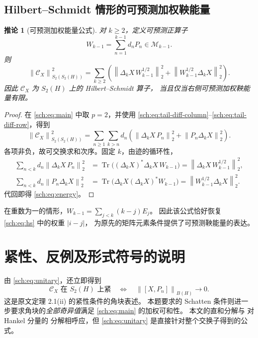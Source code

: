\documentclass[UTF8,11pt,a4paper,fontset=fandol]{ctexart}
\newtheorem{corollary}[theorem]{推论}
\theoremstyle{remark}
\newcommand{\Tr}{\operatorname{Tr}}
\newcommand{\CC}{\mathcal C}
\newcommand{\norm}[1]{\left\lVert #1\right\rVert}
\numberwithin{equation}{section}
\begin{document}
\subsection{Hilbert--Schmidt 情形的可预测加权鞅能量}

\begin{corollary}[可预测加权能量公式]\label{sch:cor:energy}
对 $k\geq2$，定义可预测正算子
\[
 W_{k-1}=\sum_{n=1}^{k-1}d_nP_n\in\mathcal M_{k-1}.
\]
则
\begin{equation}\label{sch:eq:energy}
 \boxed{\quad
 \norm{\CC_X}_{S_2(S_2(H))}^2
 =\sum_{k\geq2}\left(
   \norm{\Delta_kX\,W_{k-1}^{1/2}}_2^2
  +\norm{W_{k-1}^{1/2}\Delta_kX}_2^2\right).
 \quad}
\end{equation}
因此 $\CC_X$ 为 $S_2(H)$ 上的 Hilbert--Schmidt 算子，
当且仅当右侧可预测加权鞅能量有限。
\end{corollary}

\begin{proof}
在 \eqref{sch:eq:main} 中取 $p=2$，并使用
\eqref{sch:eq:tail-diff-column}--\eqref{sch:eq:tail-diff-row}，得到
\[
 \norm{\CC_X}_{S_2(S_2(H))}^2
 =\sum_{n\geq1}\sum_{k>n}d_n\left(
   \norm{\Delta_kX\,P_n}_2^2+\norm{P_n\Delta_kX}_2^2\right).
\]
各项非负，故可交换求和次序。固定 $k$，由迹的循环性，
\begin{align*}
 \sum_{n<k}d_n\norm{\Delta_kX\,P_n}_2^2
 &=\Tr\bigl((\Delta_kX)^*\Delta_kX\,W_{k-1}\bigr)
  =\norm{\Delta_kX\,W_{k-1}^{1/2}}_2^2,\\
 \sum_{n<k}d_n\norm{P_n\Delta_kX}_2^2
 &=\Tr\bigl(\Delta_kX(\Delta_kX)^*W_{k-1}\bigr)
  =\norm{W_{k-1}^{1/2}\Delta_kX}_2^2.
\end{align*}
代回即得 \eqref{sch:eq:energy}。
\end{proof}

在重数为一的情形，$W_{k-1}=\sum_{j<k}(k-j)E_j$。
因此该公式恰好恢复 \eqref{sch:eq:hs} 中的权重 $|i-j|$，
为原先的矩阵元素条件提供了可预测鞅能量的表达。

\section{紧性、反例及形式符号的说明}\label{sec:compact}

由 \eqref{sch:eq:unitary}，还立即得到
\[
 \CC_X\text{ 在 }S_2(H)\text{ 上紧}
 \quad\Longleftrightarrow\quad
 \norm{[X,P_n]}_{B(H)}\longrightarrow0.
\]
这是原文定理 2.1(ii) 的紧性条件的角块表述。
本题要求的 Schatten 条件则进一步要求角块的\emph{全部奇异值}满足
\eqref{sch:eq:main} 的加权可和性。
本文的直和分解与 \cite[p.~279, Remark (2)]{Power} 对 Hankel 分量的
分解相呼应，但 \eqref{sch:eq:unitary} 是直接针对整个交换子得到的公式。
\end{document}

